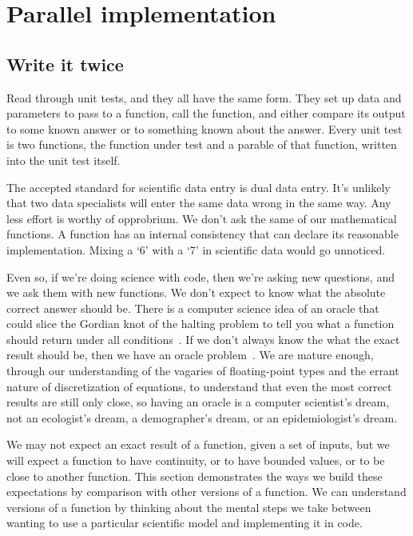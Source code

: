 \documentclass[fleqn,10pt]{olplainarticle}
\begin{document}
\section{Parallel implementation}\label{sec:parallel-implementation}
\subsection{Write it twice}\label{sec:parallel-twice}
Read through unit tests, and they all have the same form.
They set up data and parameters to pass to a function, call the
function, and either compare its output to some known answer or to
something known about the answer. Every unit test is two
functions, the function under test and a parable
of that function, written into the unit test itself.

The accepted standard for scientific data entry is dual data
entry. It's unlikely that two data specialists will enter
the same data wrong in the same way. Any less effort is
worthy of opprobrium.
We don't ask the same of our mathematical functions. A function
has an internal consistency that can declare its reasonable
implementation. Mixing a `6' with a `7' in scientific data
would go unnoticed.

Even so, if we're doing science with code, then we're asking
new questions, and we ask them with new functions. We don't
expect to know what the absolute correct answer should be.
There is a computer science idea of an oracle that could
slice the Gordian knot of the halting problem to tell you
what a function should return under all
conditions~\citep{howden1986functional}. If we don't always
know the what the exact result should be, then we have an
oracle problem~\citep{sirer1999using}. We are mature enough,
through our understanding of the vagaries of floating-point
types and the errant nature of discretization of equations,
to understand that even the most correct results are still
only close, so having an oracle is a computer scientist's
dream, not an ecologist's dream, a demographer's dream,
or an epidemiologist's dream.

We may not expect an exact result of a function, given
a set of inputs, but we will expect a function to have continuity,
or to have bounded values, or to be close to another function.
This section demonstrates the ways we build these expectations
by comparison with other versions of a function. We can understand
versions of a function by thinking about the mental steps
we take between wanting to use a particular scientific model
and implementing it in code.
\end{document}
